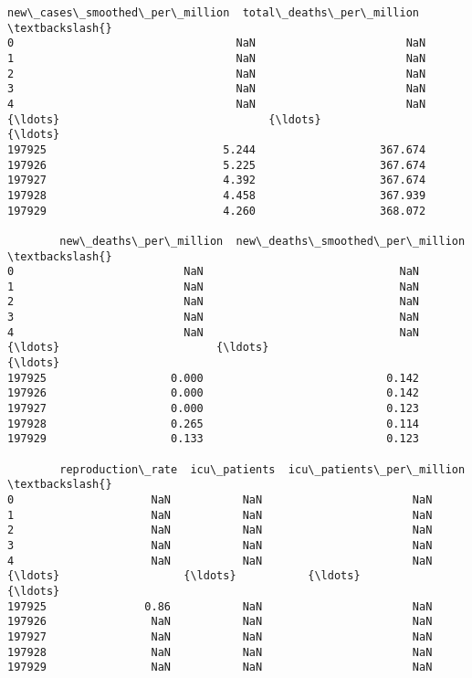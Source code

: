 \documentclass[11pt]{article}
\begin{document}
\begin{tcolorbox}[breakable, size=fbox, boxrule=.5pt, pad at break*=1mm, opacityfill=0]
\begin{Verbatim}[commandchars=\\\{\}]
        new\_cases\_smoothed\_per\_million  total\_deaths\_per\_million  \textbackslash{}
0                                  NaN                       NaN
1                                  NaN                       NaN
2                                  NaN                       NaN
3                                  NaN                       NaN
4                                  NaN                       NaN
{\ldots}                                {\ldots}                       {\ldots}
197925                           5.244                   367.674
197926                           5.225                   367.674
197927                           4.392                   367.674
197928                           4.458                   367.939
197929                           4.260                   368.072

        new\_deaths\_per\_million  new\_deaths\_smoothed\_per\_million  \textbackslash{}
0                          NaN                              NaN
1                          NaN                              NaN
2                          NaN                              NaN
3                          NaN                              NaN
4                          NaN                              NaN
{\ldots}                        {\ldots}                              {\ldots}
197925                   0.000                            0.142
197926                   0.000                            0.142
197927                   0.000                            0.123
197928                   0.265                            0.114
197929                   0.133                            0.123

        reproduction\_rate  icu\_patients  icu\_patients\_per\_million  \textbackslash{}
0                     NaN           NaN                       NaN
1                     NaN           NaN                       NaN
2                     NaN           NaN                       NaN
3                     NaN           NaN                       NaN
4                     NaN           NaN                       NaN
{\ldots}                   {\ldots}           {\ldots}                       {\ldots}
197925               0.86           NaN                       NaN
197926                NaN           NaN                       NaN
197927                NaN           NaN                       NaN
197928                NaN           NaN                       NaN
197929                NaN           NaN                       NaN


\end{Verbatim}
\end{tcolorbox}
\end{document}
